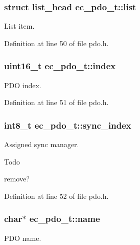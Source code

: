 \subsubsection[{list}]{\setlength{\rightskip}{0pt plus 5cm}struct list\-\_\-head ec\-\_\-pdo\-\_\-t\-::list}\label{structec__pdo__t_aa7e6a0e0405c93414052c6d998d604ad}


List item. 



Definition at line 50 of file pdo.\-h.

\subsubsection[{index}]{\setlength{\rightskip}{0pt plus 5cm}uint16\-\_\-t ec\-\_\-pdo\-\_\-t\-::index}\label{structec__pdo__t_ae319ba9b8bed2ac49cf6596ff690cfdd}


P\-D\-O index. 



Definition at line 51 of file pdo.\-h.

\subsubsection[{sync\-\_\-index}]{\setlength{\rightskip}{0pt plus 5cm}int8\-\_\-t ec\-\_\-pdo\-\_\-t\-::sync\-\_\-index}\label{structec__pdo__t_ade04e761df137353930d271ed34120c9}


Assigned sync manager. 

\begin{DoxyRefDesc}{Todo}
\item[{\bf Todo}]remove? \end{DoxyRefDesc}


Definition at line 52 of file pdo.\-h.

\subsubsection[{name}]{\setlength{\rightskip}{0pt plus 5cm}char$\ast$ ec\-\_\-pdo\-\_\-t\-::name}\label{structec__pdo__t_aee9c14db0de4c72475b8975d5630ad94}


P\-D\-O name. 



